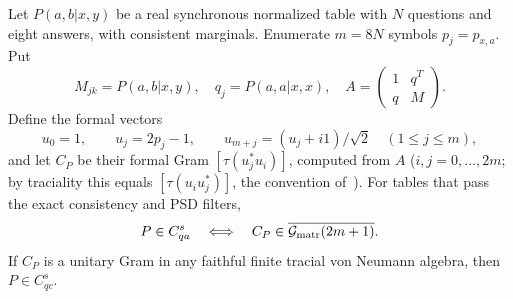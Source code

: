 \begin{lemma}\label{sw:fd-lem:gram}
Let $P(a,b|x,y)$ be a real synchronous normalized table with $N$ questions and eight answers, with consistent marginals. Enumerate $m=8N$ symbols $p_j=p_{x,a}$. Put
\[
M_{jk}=P(a,b|x,y),\quad q_j=P(a,a|x,x),\quad
A=\begin{pmatrix}1&q^T\\q&M\end{pmatrix}.
\]
Define the formal vectors
\[
u_0=1,\qquad u_j=2p_j-1,\qquad
u_{m+j}=(u_j+i1)/\sqrt2\quad(1\le j\le m),
\]
and let $C_P$ be their formal Gram $[\tau(u_j^*u_i)]$, computed from $A$ ($i,j=0,\dots,2m$; by traciality this equals $[\tau(u_iu_j^*)]$, the convention of~\cite{Musat25}). For tables that pass the exact consistency and PSD filters,
\begin{equation}\label{sw:fd-eq:equivalence}
P\in C_{qa}^{s}\quad\Longleftrightarrow\quad
C_P\in\overline{\mathcal G_{\rm matr}(2m+1)}.
\end{equation}
If $C_P$ is a unitary Gram in any faithful finite tracial von Neumann algebra, then $P\in C_{qc}^{s}$.
\end{lemma}

